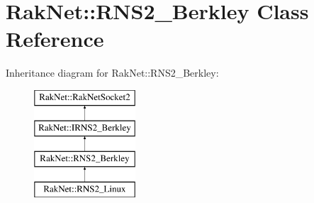 \hypertarget{class_rak_net_1_1_r_n_s2___berkley}{\section{Rak\-Net\-:\-:R\-N\-S2\-\_\-\-Berkley Class Reference}
\label{class_rak_net_1_1_r_n_s2___berkley}
}
Inheritance diagram for Rak\-Net\-:\-:R\-N\-S2\-\_\-\-Berkley\-:\begin{figure}[H]
\begin{center}
\leavevmode
\includegraphics[height=4.000000cm]{class_rak_net_1_1_r_n_s2___berkley}
\end{center}
\end{figure}
